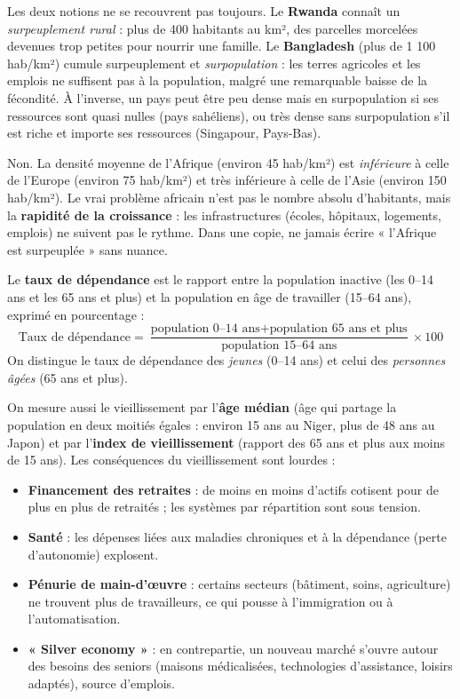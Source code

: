 \documentclass[11pt]{article}
\newcounter{popsec}
\newcounter{popsub}
\newcommand{\courssub}[1]{%
  \stepcounter{popsub}%
  \par\vspace{9pt}\noindent{\popxbold\fontsize{11.5}{13}\selectfont\color{popink}{\color{poporange}\thepopsec.\thepopsub}\hspace{6pt}#1}\par\nopagebreak\vspace{4pt}
}
\begin{document}
Les deux notions ne se recouvrent pas toujours. Le \textbf{Rwanda} connaît un \emph{surpeuplement rural} : plus de 400 habitants au km², des parcelles morcelées devenues trop petites pour nourrir une famille. Le \textbf{Bangladesh} (plus de 1 100 hab/km²) cumule surpeuplement et \emph{surpopulation} : les terres agricoles et les emplois ne suffisent pas à la population, malgré une remarquable baisse de la fécondité. À l'inverse, un pays peut être peu dense mais en surpopulation si ses ressources sont quasi nulles (pays sahéliens), ou très dense sans surpopulation s'il est riche et importe ses ressources (Singapour, Pays-Bas).

\begin{attention}
Non. La densité moyenne de l'Afrique (environ 45 hab/km²) est \emph{inférieure} à celle de l'Europe (environ 75 hab/km²) et très inférieure à celle de l'Asie (environ 150 hab/km²). Le vrai problème africain n'est pas le nombre absolu d'habitants, mais la \textbf{rapidité de la croissance} : les infrastructures (écoles, hôpitaux, logements, emplois) ne suivent pas le rythme. Dans une copie, ne jamais écrire « l'Afrique est surpeuplée » sans nuance.
\end{attention}

\courssub{Le vieillissement : indicateurs et conséquences}

\begin{definition}
Le \textbf{taux de dépendance} est le rapport entre la population inactive (les 0--14 ans et les 65 ans et plus) et la population en âge de travailler (15--64 ans), exprimé en pourcentage :
\[ \text{Taux de dépendance} = \frac{\text{population 0--14 ans} + \text{population 65 ans et plus}}{\text{population 15--64 ans}} \times 100 \]
On distingue le taux de dépendance des \emph{jeunes} (0--14 ans) et celui des \emph{personnes âgées} (65 ans et plus).
\end{definition}

On mesure aussi le vieillissement par l'\textbf{âge médian} (âge qui partage la population en deux moitiés égales : environ 15 ans au Niger, plus de 48 ans au Japon) et par l'\textbf{index de vieillissement} (rapport des 65 ans et plus aux moins de 15 ans). Les conséquences du vieillissement sont lourdes :
\begin{itemize}
\item \textbf{Financement des retraites} : de moins en moins d'actifs cotisent pour de plus en plus de retraités ; les systèmes par répartition sont sous tension.
\item \textbf{Santé} : les dépenses liées aux maladies chroniques et à la dépendance (perte d'autonomie) explosent.
\item \textbf{Pénurie de main-d'œuvre} : certains secteurs (bâtiment, soins, agriculture) ne trouvent plus de travailleurs, ce qui pousse à l'immigration ou à l'automatisation.
\item \textbf{« Silver economy »} : en contrepartie, un nouveau marché s'ouvre autour des besoins des seniors (maisons médicalisées, technologies d'assistance, loisirs adaptés), source d'emplois.
\end{itemize}
\end{document}
